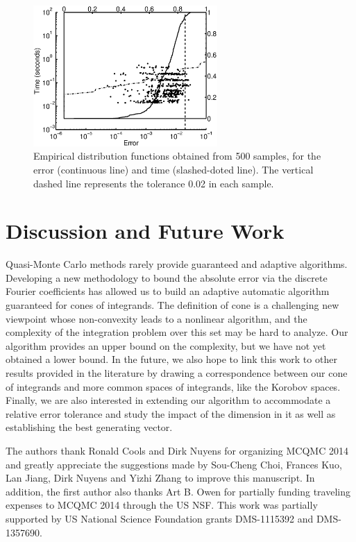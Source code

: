 \documentclass[graybox]{svmult}
\begin{document}
\begin{figure}[h!]
\centering
\includegraphics[width=7cm]{Images/geomeancubLatticeErrTime_d_64.eps} 
\caption{Empirical distribution functions obtained from 500 samples, for the error (continuous line) and time (slashed-doted line). The vertical dashed line represents the tolerance 0.02 in each sample. \label{geoAsianmean}}
\end{figure}

\section{Discussion and Future Work}
Quasi-Monte Carlo methods rarely provide guaranteed and adaptive algorithms. Developing a new methodology to bound the absolute error via the discrete Fourier coefficients has allowed us to build an adaptive automatic algorithm guaranteed for cones of integrands. The definition of cone is a challenging new viewpoint whose non-convexity leads to a nonlinear algorithm, and the complexity of the integration problem over this set may be hard to analyze. Our algorithm provides an upper bound on the complexity, but we have not yet obtained a  lower bound. In the future, we also hope to link this work to other results provided in the literature by drawing a correspondence between our cone of integrands and more common spaces of integrands, like the Korobov spaces. Finally, we are also interested in extending our algorithm to accommodate  a relative error tolerance and study the impact of the dimension in it as well as establishing the best generating vector.

\begin{acknowledgement}
The authors thank Ronald Cools and Dirk Nuyens for organizing MCQMC 2014 and greatly appreciate the suggestions made by Sou-Cheng Choi, Frances Kuo, Lan Jiang, Dirk Nuyens and Yizhi Zhang to improve this manuscript. In addition, the first author also thanks Art B. Owen for partially funding traveling expenses to MCQMC 2014 through the US NSF.
This work was partially supported by US National Science Foundation grants DMS-1115392 and DMS-1357690. 
\end{acknowledgement}



\end{document}
